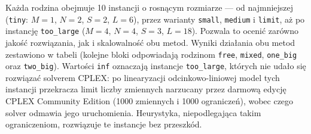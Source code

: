 \documentclass{article}
\begin{document}
Każda rodzina obejmuje 10 instancji o rosnącym rozmiarze — od najmniejszej (\texttt{tiny}: $M=1$, $N=2$, $S=2$, $L=6$), przez warianty \texttt{small}, \texttt{medium} i \texttt{limit}, aż po instancję \texttt{too\_large} ($M=4$, $N=4$, $S=3$, $L=18$). Pozwala to ocenić zarówno jakość rozwiązania, jak i skalowalność obu metod. Wyniki działania obu metod zestawiono w tabeli (kolejne bloki odpowiadają rodzinom \texttt{free}, \texttt{mixed}, \texttt{one\_big} oraz \texttt{two\_big}). Wartości \texttt{inf} oznaczają instancje \texttt{too\_large}, których nie udało się rozwiązać solverem CPLEX: po linearyzacji odcinkowo-liniowej model tych instancji przekracza limit liczby zmiennych narzucany przez darmową edycję CPLEX Community Edition (1000 zmiennych i 1000 ograniczeń), wobec czego solver odmawia jego uruchomienia. Heurystyka, niepodlegająca takim ograniczeniom, rozwiązuje te instancje bez przeszkód.
\end{document}
